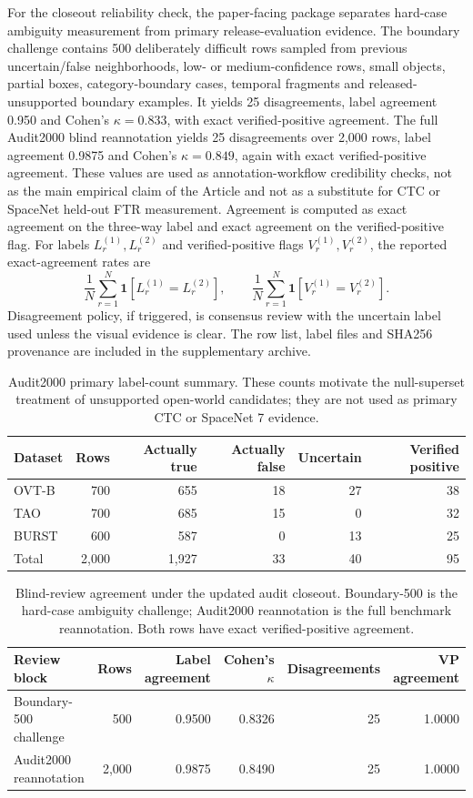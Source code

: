 \documentclass[11pt]{article}
\newcommand{\ind}{\mathbf 1}
\begin{document}
For the closeout reliability check, the paper-facing package separates hard-case ambiguity measurement from primary release-evaluation evidence.
The boundary challenge contains 500 deliberately difficult rows sampled from previous uncertain/false neighborhoods, low- or medium-confidence rows, small objects, partial boxes, category-boundary cases, temporal fragments and released-unsupported boundary examples.
It yields 25 disagreements, label agreement 0.950 and Cohen's \(\kappa=0.833\), with exact verified-positive agreement.
The full Audit2000 blind reannotation yields 25 disagreements over 2,000 rows, label agreement 0.9875 and Cohen's \(\kappa=0.849\), again with exact verified-positive agreement.
These values are used as annotation-workflow credibility checks, not as the main empirical claim of the Article and not as a substitute for CTC or SpaceNet held-out FTR measurement.
Agreement is computed as exact agreement on the three-way label and exact agreement on the verified-positive flag.
For labels \(L^{(1)}_r,L^{(2)}_r\) and verified-positive flags \(V^{(1)}_r,V^{(2)}_r\), the reported exact-agreement rates are
\[
\frac{1}{N}\sum_{r=1}^{N}\ind[L^{(1)}_r=L^{(2)}_r],
\qquad
\frac{1}{N}\sum_{r=1}^{N}\ind[V^{(1)}_r=V^{(2)}_r].
\]
Disagreement policy, if triggered, is consensus review with the uncertain label used unless the visual evidence is clear.
The row list, label files and SHA256 provenance are included in the supplementary archive.

\begin{table}[h]
\centering
\caption{Audit2000 primary label-count summary. These counts motivate the null-superset treatment of unsupported open-world candidates; they are not used as primary CTC or SpaceNet 7 evidence.}
\small
\begin{tabular}{lrrrrr}
\toprule
Dataset & Rows & Actually true & Actually false & Uncertain & Verified positive \\
\midrule
OVT-B & 700 & 655 & 18 & 27 & 38 \\
TAO & 700 & 685 & 15 & 0 & 32 \\
BURST & 600 & 587 & 0 & 13 & 25 \\
\midrule
Total & 2,000 & 1,927 & 33 & 40 & 95 \\
\bottomrule
\end{tabular}
\end{table}

\begin{table}[h]
\centering
\caption{Blind-review agreement under the updated audit closeout. Boundary-500 is the hard-case ambiguity challenge; Audit2000 reannotation is the full benchmark reannotation. Both rows have exact verified-positive agreement.}
\small
\begin{tabular}{lrrrrr}
\toprule
Review block & Rows & Label agreement & Cohen's \(\kappa\) & Disagreements & VP agreement \\
\midrule
Boundary-500 challenge & 500 & 0.9500 & 0.8326 & 25 & 1.0000 \\
Audit2000 reannotation & 2,000 & 0.9875 & 0.8490 & 25 & 1.0000 \\
\bottomrule
\end{tabular}
\end{table}
\end{document}

